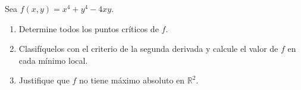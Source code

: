 Sea $f(x, y) = x^4 + y^4 - 4xy$.
\begin{enumerate}
    \item Determine todos los puntos críticos de $f$.
    \item Clasifíquelos con el criterio de la segunda derivada y calcule el valor de $f$ en cada mínimo local.
    \item Justifique que $f$ no tiene máximo absoluto en $\mathbb{R}^2$.
\end{enumerate}
